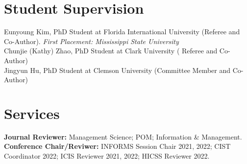 \documentclass[margin,line]{resume}
\begin{document}
\begin{resume}
         


      \section{\mysidestyle Student Supervision} 
         Eunyoung Kim, PhD Student at Florida International University (Referee and Co-Author). \textit{First Placement: Mississippi State University} \\
         Chunjie (Kathy) Zhao, PhD Student at Clark University ( Referee and Co-Author)\\
         Jingyun Hu, PhD Student at Clemson University (Committee Member and Co-Author)

      \section{\mysidestyle Services} 
         \textbf{Journal Reviewer:} Management Science; POM; Information \& Management.\\
         \textbf{Conference Chair/Reviwer:} INFORMS Session Chair 2021, 2022; CIST Coordinator 2022; ICIS Reviewer 2021, 2022; HICSS Reviewer 2022.


\end{resume}
\end{document}
